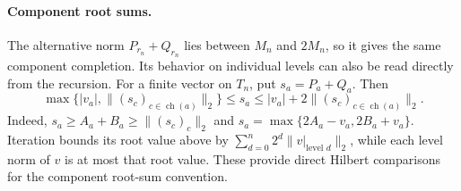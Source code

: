 \paragraph{Component root sums.}
The alternative norm $P_{r_n}+Q_{r_n}$ lies between $M_n$ and $2M_n$,
so it gives the same component completion. Its behavior on individual
levels can also be read directly from the recursion. For a finite
vector on $T_n$, put $s_a=P_a+Q_a$. Then
\begin{equation}\label{rec:sum-level-bounds}
 \max\{|v_a|,\|(s_c)_{c\in\operatorname{ch}(a)}\|_2\}
 \le s_a\le |v_a|+2\|(s_c)_{c\in\operatorname{ch}(a)}\|_2.
\end{equation}
Indeed, $s_a\ge A_a+B_a\ge\|(s_c)_c\|_2$ and
$s_a=\max\{2A_a-v_a,2B_a+v_a\}$.
Iteration bounds its root value above by
$\sum_{d=0}^n2^d\|v|_{\text{level }d}\|_2$, while each level norm of
$v$ is at most that root value. These provide direct Hilbert comparisons
for the component root-sum convention.
